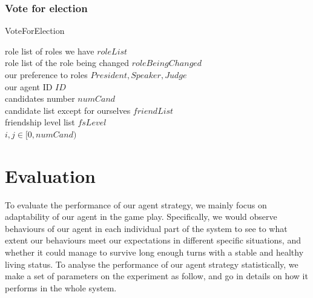 \subsubsection{Vote for election}
\begin{algorithm}[H]
\caption{VoteForElection} 
    role list of roles we have $roleList$\\
    role list of the role being changed  $roleBeingChanged$\\
    our preference to roles ${President, Speaker, Judge}$\\
    our agent ID $ID$\\
    candidates number $numCand$\\
    candidate list except for ourselves $friendList$\\
    friendship level list $fsLevel$\\
    $i, j \in [0, numCand)$\\
\end{algorithm}

\section{Evaluation} \label{sec:Team6_Evaluation}
To evaluate the performance of our agent strategy, we mainly focus on adaptability of our agent in the game play. Specifically, we would observe behaviours of our agent in each individual part of the system to see to what extent our behaviours meet our expectations in different specific situations, and whether it could manage to survive long enough turns with a stable and healthy living status. To analyse the performance of our agent strategy statistically, we make a set of parameters on the experiment as follow, and go in details on how it performs in the whole system.


